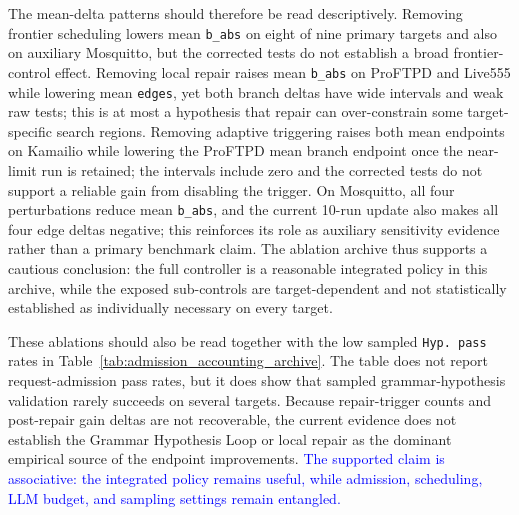\documentclass[final,5p,times,number]{elsarticle}
\begin{document}
The mean-delta patterns should therefore be read descriptively. Removing frontier scheduling lowers mean \texttt{b\_abs} on eight of nine primary targets and also on auxiliary Mosquitto, but the corrected tests do not establish a broad frontier-control effect. Removing local repair raises mean \texttt{b\_abs} on ProFTPD and Live555 while lowering mean \texttt{edges}, yet both branch deltas have wide intervals and weak raw tests; this is at most a hypothesis that repair can over-constrain some target-specific search regions. Removing adaptive triggering raises both mean endpoints on Kamailio while lowering the ProFTPD mean branch endpoint once the near-limit run is retained; the intervals include zero and the corrected tests do not support a reliable gain from disabling the trigger. On Mosquitto, all four perturbations reduce mean \texttt{b\_abs}, and the current 10-run update also makes all four edge deltas negative; this reinforces its role as auxiliary sensitivity evidence rather than a primary benchmark claim. The ablation archive thus supports a cautious conclusion: the full controller is a reasonable integrated policy in this archive, while the exposed sub-controls are target-dependent and not statistically established as individually necessary on every target.

These ablations should also be read together with the low sampled \texttt{Hyp. pass} rates in Table~\ref{tab:admission_accounting_archive}. The table does not report request-admission pass rates, but it does show that sampled grammar-hypothesis validation rarely succeeds on several targets. Because repair-trigger counts and post-repair gain deltas are not recoverable, the current evidence does not establish the Grammar Hypothesis Loop or local repair as the dominant empirical source of the endpoint improvements. \textcolor{blue}{The supported claim is associative: the integrated policy remains useful, while admission, scheduling, LLM budget, and sampling settings remain entangled.}
\end{document}
